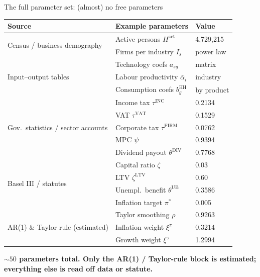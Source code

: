 \documentclass[9pt]{beamer}
\begin{document}
\begin{frame}{The full parameter set: (almost) no free parameters}
    \footnotesize
    \begin{tabular}{@{}lll@{}}
        \toprule
        \textbf{Source} & \textbf{Example parameters} & \textbf{Value} \\
        \midrule
        \multirow{2}{*}{Census / business demography}
            & Active persons $H^{\mathrm{act}}$ & 4{,}729{,}215 \\
            & Firms per industry $I_s$          & power law \\
        \midrule
        \multirow{3}{*}{Input--output tables}
            & Technology coefs $a_{sg}$          & matrix \\
            & Labour productivity $\bar{\alpha}_i$ & industry \\
            & Consumption coefs $b^{\mathrm{HH}}_g$ & by product \\
        \midrule
        \multirow{5}{*}{Gov.\ statistics / sector accounts}
            & Income tax $\tau^{\mathrm{INC}}$       & 0.2134 \\
            & VAT $\tau^{\mathrm{VAT}}$              & 0.1529 \\
            & Corporate tax $\tau^{\mathrm{FIRM}}$   & 0.0762 \\
            & MPC $\psi$                             & 0.9394 \\
            & Dividend payout $\theta^{\mathrm{DIV}}$ & 0.7768 \\
        \midrule
        \multirow{4}{*}{Basel III / statutes}
            & Capital ratio $\zeta$                  & 0.03 \\
            & LTV $\zeta^{\mathrm{LTV}}$             & 0.60 \\
            & Unempl.\ benefit $\theta^{\mathrm{UB}}$ & 0.3586 \\
            & Inflation target $\pi^{*}$             & 0.005 \\
        \midrule
        \multirow{3}{*}{AR(1) \& Taylor rule (estimated)}
            & Taylor smoothing $\rho$                & 0.9263 \\
            & Inflation weight $\xi^{\pi}$           & 0.3214 \\
            & Growth weight $\xi^{\gamma}$           & 1.2994 \\
        \bottomrule
    \end{tabular}
    \vspace{0.3em}

    \normalsize
    \textbf{$\sim 50$ parameters total. Only the AR(1) / Taylor-rule block is estimated; everything else is read off data or statute.}
\end{frame}
\end{document}
